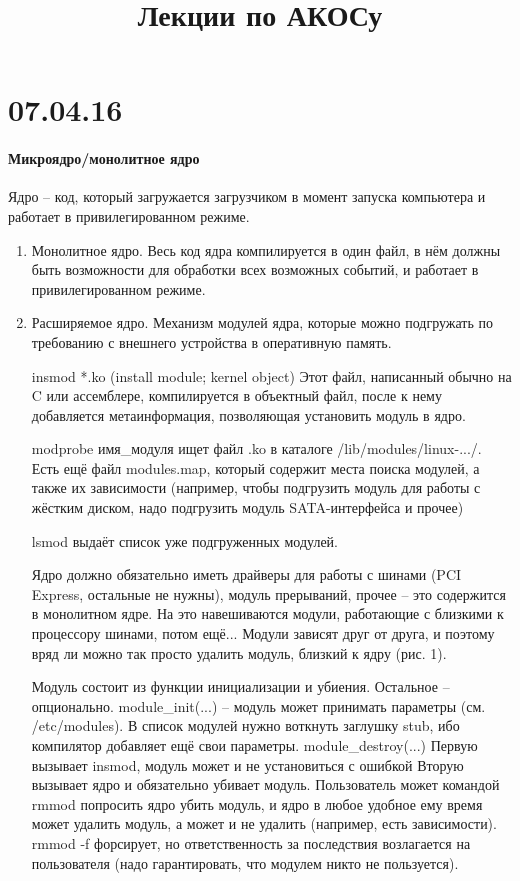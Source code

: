 \documentclass[a4paper,10pt]{article}
\title{\textbf{Лекции по АКОСу}}
\begin{document}
\maketitle

\section{07.04.16}
\paragraph{Микроядро/монолитное ядро}
Ядро -- код, который загружается загрузчиком в момент запуска компьютера и работает в привилегированном режиме.
\begin{enumerate}
\item Монолитное ядро. Весь код ядра компилируется в один файл, в нём должны быть возможности для обработки всех возможных событий, и работает в привилегированном режиме.
\item Расширяемое ядро. Механизм модулей ядра, которые можно подгружать по требованию с внешнего устройства в оперативную память.

insmod *.ko (install module; kernel object)
Этот файл, написанный обычно на C или ассемблере, компилируется в объектный файл, после к нему добавляется метаинформация, позволяющая установить модуль в ядро.

modprobe имя\_модуля ищет файл .ko в каталоге /lib/modules/linux-.../. Есть ещё файл modules.map, который содержит места поиска модулей, а также их зависимости (например, чтобы подгрузить модуль для работы с жёстким диском, надо подгрузить модуль SATA-интерфейса и прочее)

lsmod выдаёт список уже подгруженных модулей.

Ядро должно обязательно иметь драйверы для работы с шинами (PCI Express, остальные не нужны), модуль прерываний, прочее -- это содержится в монолитном ядре. На это навешиваются модули, работающие с близкими к процессору шинами, потом ещё... Модули зависят друг от друга, и поэтому вряд ли можно так просто удалить модуль, близкий к ядру (рис. 1).

Модуль состоит из функции инициализации и убиения. Остальное -- опционально.
module\_init(...) -- модуль может принимать параметры (см. /etc/modules).
В список модулей нужно воткнуть заглушку stub, ибо компилятор добавляет ещё свои параметры.
module\_destroy(...)
Первую вызывает insmod, модуль может и не установиться с ошибкой
Вторую вызывает ядро и обязательно убивает модуль. 
Пользователь может командой rmmod попросить ядро убить модуль, и ядро в любое удобное ему время может удалить модуль, а может и не удалить (например, есть зависимости). rmmod -f форсирует, но ответственность за последствия возлагается на пользователя (надо гарантировать, что модулем никто не пользуется).


\end{enumerate}
\end{document}
